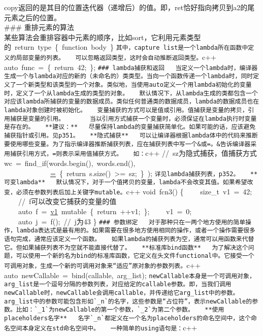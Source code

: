 \documentclass[
  a4paper,
  oneside,tablecaptionabove
]{scrbook}
\begin{document}
copy返回的是其目的位置迭代器（递增后）的值。即，ret恰好指向拷贝到a2的尾元素之后的位置。\\
\#\#\# 重排元素的算法\\
某些算法会重排容器中元素的顺序，比如sort，它利用元素类型的~return~type~\{~function~body~\}
\lstinline!其中，capture list是一个lambda所在函数中定义的局部变量的列表。   可以忽略返回类型，这时会自动推断返回类型。!c++
auto~func~=~\href{}{}\{~return~42;~\};
\lstinline!### lambda捕获和返回   当定义一个lambda时，编译器生成一个与lambda对应的新的（未命名的）类类型。当向一个函数传递一个lambda时，同时定义了一个新类型和该类型的一个对象。类似地，当使用auto定义一个用lambda初始化的变量时，定义了一个从lambda生成的类型的对象。   默认情况下，从lambda生成的类都包含一个对应该lambda所捕获的变量的数据成员。类似任何普通类的数据成员，lambda的数据成员也在lambda对象创建时被初始化。   变量捕获的方式可以是值或引用。值捕获是变量的拷贝，引用捕获是变量的引用。       当以引用方式捕获一个变量时，必须保证在lambda执行时变量是存在的。   **建议：**   尽量保持lambda的变量捕获简单化。如果可能的话，应该避免捕获指针或引用。见p351。   **隐式捕获**   可以让编译器根据lambda体中的代码来推断要使用哪些变量。为了指示编译器推断捕获列表，应在捕获列表中写一个&或=。&告诉编译器采用捕获引用方式，=则表示采用值捕获方式。   如：!c++
//~sz为隐式捕获，值捕获方式 wc~=~find\_if(words.begin(),~words.end(),
~~~~~~~~~~~~~\href{const\%20string\%20\&s}{=}~\{~return~s.size()~\textgreater{}=~sz;~\}~);
\lstinline!详见lambda捕获列表，p352。   **可变lambda**   默认情况下，对于一个值拷贝的变量，lambda不会改变其值。如果希望改变，必须在参数列表后加上关键字mutable。!c++
void~fcn3() \{ ~~~~size\_t~v1~=~42; ~~~~//~f可以改变它捕获的变量的值
~~~~auto~f~=~\href{}{v1}~mutable~\{~return~++v1;~\}; ~~~~v1~=~0;
~~~~auto~j~=~f();~//~j为43 \}
\lstinline!### 参数绑定   对于那种只在一两个地方使用的简单操作，lambda表达式是最有用的。如果需要在很多地方使用相同的操作，或者一个操作需要很多语句完成，通常应该定义一个函数。   如果lambda的捕获列表为空，通常可以用函数来代替它。但如果捕获列表不为空就不能直接代替了。   **标准库bind函数**   为了解决这个问题，可以使用一个新的名为bind的标准库函数，它定义在头文件functional中。它接受一个可调用对象，生成一个新的可调用对象来“适应”原对象的参数列表。!c++
auto~newCallable~=~bind(callable,~arg\_list);
\lstinline!newCallable本身是一个可调用对象，arg_list是一个逗号分隔的参数列表，对应给定的callable参数。即，当我们调用newCallable时，newCallable会调用callable，并传递给它arg_list中的参数。   arg_list中的参数可能包含形如`_n`的名字，这些参数是“占位符”，表示newCallable的参数。比如：`_1`为newCallable的第一个参数，`_2`为第二个参数。   **使用placeholders名字**   名字`_n`都定义在一个名为placeholders的命名空间中，这个命名空间本身定义在std命名空间中。   一种简单的using语句是：!c++
\end{document}
